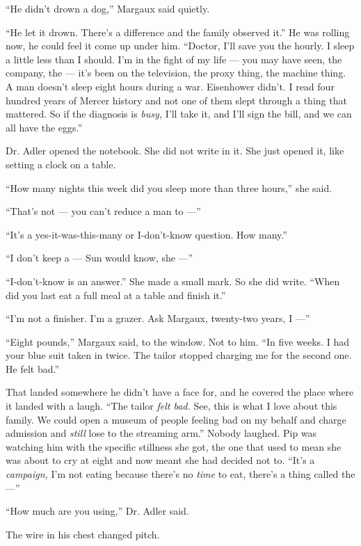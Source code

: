 \documentclass[11pt,openany]{book}
\newcommand{\scenebreak}{\par\vspace{0.5\baselineskip}\begin{center}\textasteriskcentered\quad\textasteriskcentered\quad\textasteriskcentered\end{center}\vspace{0.5\baselineskip}\par}
\begin{document}
``He didn't drown a dog,'' Margaux said quietly.

``He let it drown. There's a difference and the family observed it.'' He was rolling now, he could feel it come up under him. ``Doctor, I'll save you the hourly. I sleep a little less than I should. I'm in the fight of my life --- you may have seen, the company, the --- it's been on the television, the proxy thing, the machine thing. A man doesn't sleep eight hours during a war. Eisenhower didn't. I read four hundred years of Mercer history and not one of them slept through a thing that mattered. So if the diagnosis is \textit{busy,} I'll take it, and I'll sign the bill, and we can all have the eggs.''


\scenebreak


Dr. Adler opened the notebook. She did not write in it. She just opened it, like setting a clock on a table.

``How many nights this week did you sleep more than three hours,'' she said.

``That's not --- you can't reduce a man to ---''

``It's a yes-it-was-this-many or I-don't-know question. How many.''

``I don't keep a --- Sun would know, she ---''

``I-don't-know is an answer.'' She made a small mark. So she did write. ``When did you last eat a full meal at a table and finish it.''

``I'm not a finisher. I'm a grazer. Ask Margaux, twenty-two years, I ---''

``Eight pounds,'' Margaux said, to the window. Not to him. ``In five weeks. I had your blue suit taken in twice. The tailor stopped charging me for the second one. He felt bad.''

That landed somewhere he didn't have a face for, and he covered the place where it landed with a laugh. ``The tailor \textit{felt bad.} See, this is what I love about this family. We could open a museum of people feeling bad on my behalf and charge admission and \textit{still} lose to the streaming arm.'' Nobody laughed. Pip was watching him with the specific stillness she got, the one that used to mean she was about to cry at eight and now meant she had decided not to. ``It's a \textit{campaign,} I'm not eating because there's no \textit{time} to eat, there's a thing called the ---''

``How much are you using,'' Dr. Adler said.

The wire in his chest changed pitch.
\end{document}
